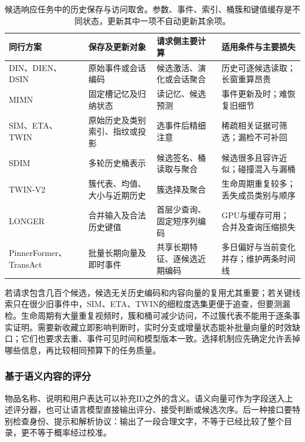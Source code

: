 \begin{table}[htbp]
  \centering
  \small
  \begin{tabularx}{\linewidth}{@{}lXXX@{}}
    \toprule
    同行方案 & 保存及更新对象 & 请求侧主要计算 & 适用条件与主要损失 \\
    \midrule
    DIN、DIEN、DSIN & 原始事件或会话编码 & 候选激活、演化或会话聚合 & 历史可逐候选读取；长窗重算昂贵 \\
    MIMN & 固定槽记忆及归纳状态 & 读记忆、候选预测 & 事件更新及时；难恢复旧细节 \\
    SIM、ETA、TWIN & 原始历史及类别索引、指纹或投影 & 选事件后精细注意 & 稀疏相关证据可筛选；漏检不可补回 \\
    SDIM & 多轮历史桶表示 & 候选签名、桶读取与聚合 & 候选很多且容许近似；碰撞混入与漏桶 \\
    TWIN-V2 & 簇代表、均值、大小与近期历史 & 簇选择及聚合 & 生命周期重复较多；丢失成员类别与顺序 \\
    LONGER & 合并输入及合法历史键值 & 首层少查询、固定短序列编码 & GPU与缓存可用；合并及查询压缩损失 \\
    PinnerFormer、TransAct & 批量长期向量及即时事件 & 共享长期特征、逐候选近期编码 & 多日偏好与当前变化并存；维护两条时间线 \\
    \bottomrule
  \end{tabularx}
  \caption{候选响应任务中的历史保存与访问取舍。参数、事件、索引、桶簇和键值缓存是不同状态，更新其中一项不自动更新其余项。}
  \label{tab:rs-history-tradeoffs}
\end{table}

若请求包含几百个候选，候选无关历史编码和内容向量的复用尤其重要；若关键线索只在很少旧事件中，SIM、ETA、TWIN的细粒度选集更便于追查，但要测漏检。生命周期有大量重复视频时，簇和桶可减少访问，不过簇代表不能用于逐条事实证明。需要新收藏立即影响判断时，实时分支或增量状态能补批量向量的时效缺口；它们也要求去重、事件可见时间和模型版本一致。选择机制应先确定允许丢掉哪些信息，再比较相同预算下的任务质量。

\subsubsection{基于语义内容的评分}
\label{sec:rs-semantic-scoring}

物品名称、说明和用户表达可以补充ID之外的含义。语义向量可作为字段送入上述评分器，也可让语言模型直接输出评分、接受判断或候选次序。后一种接口要特别检查身份、提示和解析协议：输出了一段合理文字，不等于已经比较了整个目录，更不等于概率经过校准。

